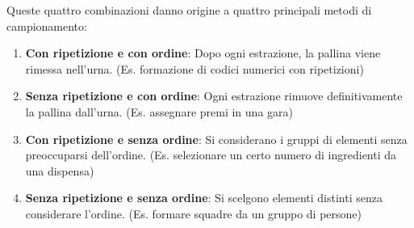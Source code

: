 \documentclass[
  italian,
  letterpaper,
  a4paper,
  11pt,
  open=any]{scrbook}
\providecommand{\tightlist}{%
  \setlength{\itemsep}{0pt}\setlength{\parskip}{0pt}}
\theoremstyle{plain}
\theoremstyle{definition}
\theoremstyle{definition}
\theoremstyle{remark}
\begin{document}
Queste quattro combinazioni danno origine a quattro principali metodi di
campionamento:

\begin{enumerate}
\def\labelenumi{\arabic{enumi}.}
\tightlist
\item
  \textbf{Con ripetizione e con ordine}: Dopo ogni estrazione, la
  pallina viene rimessa nell'urna. (Es. formazione di codici numerici
  con ripetizioni)
\item
  \textbf{Senza ripetizione e con ordine}: Ogni estrazione rimuove
  definitivamente la pallina dall'urna. (Es. assegnare premi in una
  gara)
\item
  \textbf{Con ripetizione e senza ordine}: Si considerano i gruppi di
  elementi senza preoccuparsi dell'ordine. (Es. selezionare un certo
  numero di ingredienti da una dispensa)
\item
  \textbf{Senza ripetizione e senza ordine}: Si scelgono elementi
  distinti senza considerare l'ordine. (Es. formare squadre da un gruppo
  di persone)
\end{enumerate}
\end{document}
